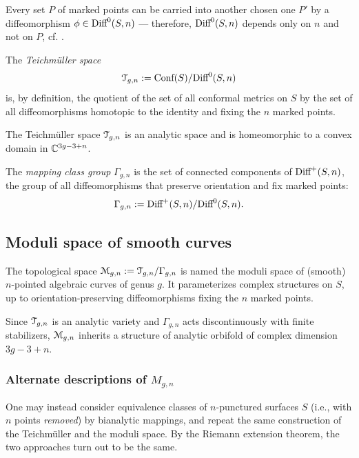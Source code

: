 Every set $P$ of marked points can be carried into another chosen one
$P'$ by a diffeomorphism $\phi \in \textrm{Diff}^0(S, n)$ --- therefore,
$\textrm{Diff}^0(S, n)$ depends only on $n$ and not on $P$, cf.
\cite{krushkal;riemann-surfaces}. 
\begin{definition}\label{dfn:teichmuller}
  The \emph{Teichm{\"u}ller space}
  \begin{equation*}
    \mathcal{T}_{g,n} := \text{\rm Conf}(S) / \textrm{Diff}^0(S, n)
  \end{equation*}
  is, by definition, the quotient of the set of all conformal metrics on
  $S$ by the set of all diffeomorphisms homotopic to the identity and
  fixing the $n$ marked points.
\end{definition}
The Teichm{\"u}ller space $\mathcal{T}_{g,n}$ is an analytic space and is
homeomorphic to a convex domain in $\mathbb{C}^{3g - 3 + n}$.

\begin{definition}\label{dfn:mapping-class-group}
  The \emph{mapping class group} $\Gamma_{g,n}$ is the set of connected
  components of $\textrm{Diff}^+(S, n)$, the group of all diffeomorphisms that
  preserve orientation and fix marked points:
  \begin{equation*}
    \Gamma_{g,n} := \textrm{Diff}^+ (S, n) / \textrm{Diff}^0(S, n).
  \end{equation*}
\end{definition}


\subsection{Moduli space of smooth curves}
\label{sec:Mgn}

\begin{definition}
  The topological space $\mathcal{M}_{g,n} := \mathcal{T}_{g,n} / \Gamma_{g,n}$ is named the
  moduli space of (smooth) $n$-pointed algebraic curves of genus $g$.
  It parameterizes complex structures on $S$, up to
  orientation-preserving diffeomorphisms fixing the $n$ marked points.
\end{definition}
Since $\mathcal{T}_{g,n}$ is an analytic variety and $\Gamma_{g,n}$ acts
discontinuously with finite stabilizers, $\mathcal{M}_{g,n}$ inherits a
structure of analytic orbifold of complex dimension $3g - 3 + n$.

\subsubsection{Alternate descriptions of $M_{g,n}$}
\label{sec:alternate-Mgn}
One may instead consider equivalence classes of $n$-punctured surfaces
$S$ (i.e., with $n$ points \emph{removed}) by bianalytic mappings, and
repeat the same construction of the Teichm\"uller and the moduli space.
By the Riemann extension theorem, the two approaches turn out to be
the same.

